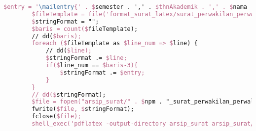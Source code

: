 \begin{lstlisting}[language=tex,basicstyle=\tiny,caption=HistorysuratController.php]
        $entry = '\mailentry{' . $semester . ',' . $thnAkademik . ',' . $nama . ',' . $prodi . ',' . $npm . ',' . $namaWakil . ',' . $prodiWakil . ',' . $npmWakil . ',' . $dosenWali . ',' . $alasan . ',' . $kodeMK1 . ',' . $matkul1 . ',' . $sks1 . ',' . $kodeMK2 . ',' . $matkul2 . ',' . $sks2 . ',' . $kodeMK3 . ',' . $matkul3 . ',' . $sks3 . ',' . $kodeMK4 . ',' . $matkul4 . ',' . $sks4 . ',' . $kodeMK5 . ',' . $matkul5 . ',' . $sks5 . ',' . $kodeMK6 . ',' . $matkul6 . ',' . $sks6 . ',' . $tanggal . '}';
        $fileTemplate = file('format_surat_latex/surat_perwakilan_perwalian_6mk.tex');
        $stringFormat = "";
        $baris = count($fileTemplate);
        // dd($baris);
        foreach ($fileTemplate as $line_num => $line) {
            // dd($line);
            $stringFormat .= $line;
            if($line_num == $baris-3){
                $stringFormat .= $entry;
            }
        }
        // dd($stringFormat);
        $file = fopen("arsip_surat/" . $npm . "_surat_perwakilan_perwalian_6mk.tex", "w");
        fwrite($file, $stringFormat);
        fclose($file);
        shell_exec('pdflatex -output-directory arsip_surat arsip_surat/' . $npm . '_surat_perwakilan_perwalian_6mk.tex');


\end{lstlisting}
